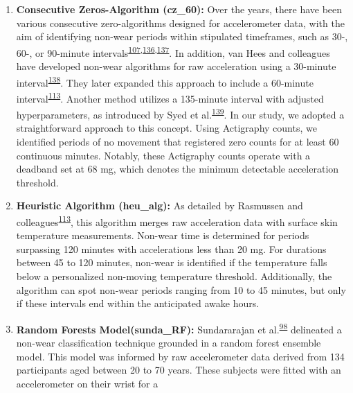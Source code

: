 \documentclass[
  10pt,
]{scrbook}
\let\originaltextbf\textbf
\renewcommand{\textbf}[1]{\textcolor{color1}{\originaltextbf{#1}}}
\begin{document}
\begin{enumerate}
\def\labelenumi{\arabic{enumi}.}
\item
  \textsf{\textbf{Consecutive Zeros-Algorithm (cz\_60):}} Over the
  years, there have been various consecutive zero-algorithms designed
  for accelerometer data, with the aim of identifying non-wear periods
  within stipulated timeframes, such as 30-, 60-, or 90-minute
  intervals\textsuperscript{\protect\hyperlink{ref-hecht_methodology_2009}{107},\protect\hyperlink{ref-troiano_physical_2008}{136},\protect\hyperlink{ref-choi_validation_2011}{137}}.
  In addition, van Hees and colleagues have developed non-wear
  algorithms for raw acceleration using a 30-minute
  interval\textsuperscript{\protect\hyperlink{ref-van_hees_estimation_2011}{138}}.
  They later expanded this approach to include a 60-minute
  interval\textsuperscript{\protect\hyperlink{ref-rasmussen_short-term_2020}{113}}.
  Another method utilizes a 135-minute interval with adjusted
  hyperparameters, as introduced by Syed et
  al.\textsuperscript{\protect\hyperlink{ref-syed_evaluating_2020}{139}}.
  In our study, we adopted a straightforward approach to this concept.
  Using Actigraphy counts, we identified periods of no movement that
  registered zero counts for at least 60 continuous minutes. Notably,
  these Actigraphy counts operate with a deadband set at 68 mg, which
  denotes the minimum detectable acceleration threshold.
\item
  \textsf{\textbf{Heuristic Algorithm (heu\_alg):}} As detailed by
  Rasmussen and
  colleagues\textsuperscript{\protect\hyperlink{ref-rasmussen_short-term_2020}{113}},
  this algorithm merges raw acceleration data with surface skin
  temperature measurements. Non-wear time is determined for periods
  surpassing 120 minutes with accelerations less than 20 mg. For
  durations between 45 to 120 minutes, non-wear is identified if the
  temperature falls below a personalized non-moving temperature
  threshold. Additionally, the algorithm can spot non-wear periods
  ranging from 10 to 45 minutes, but only if these intervals end within
  the anticipated awake hours.
\item
  \textsf{\textbf{Random Forests Model(sunda\_RF):}} Sundararajan et
  al.\textsuperscript{\protect\hyperlink{ref-sundararajan_sleep_2021}{98}}
  delineated a non-wear classification technique grounded in a random
  forest ensemble model. This model was informed by raw accelerometer
  data derived from 134 participants aged between 20 to 70 years. These
  subjects were fitted with an accelerometer on their wrist for a

\end{enumerate}
\end{document}
